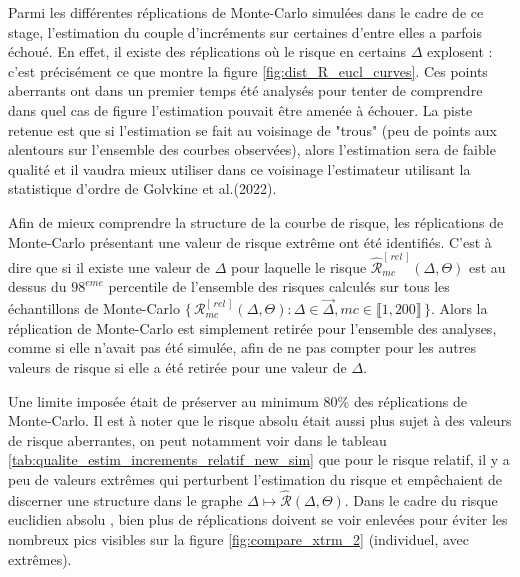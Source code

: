 
Parmi les différentes réplications de Monte-Carlo simulées dans le cadre de ce stage, l'estimation du couple d'incréments sur certaines d'entre elles a parfois échoué. En effet, il existe des réplications où le risque en certains $\Delta$ explosent : c'est précisément ce que montre la figure \ref{fig:dist_R_eucl_curves}. Ces points aberrants ont dans un premier temps été analysés pour tenter de comprendre dans quel cas de figure l'estimation pouvait être amenée à échouer. La piste retenue est que si l'estimation se fait au voisinage de "trous" (peu de points aux alentours sur l'ensemble des courbes observées), alors l'estimation sera de faible qualité et il vaudra mieux utiliser dans ce voisinage l'estimateur utilisant la statistique d'ordre de Golvkine et al.(2022).

\smallskip

Afin de mieux comprendre la structure de la courbe de risque, les réplications de Monte-Carlo présentant une valeur de risque extrême ont été identifiés. C'est à dire que si il existe une valeur de $\Delta$ pour laquelle le risque $\widehat{\mathcal R}^{[\,rel\,]}_{mc}(\Delta, \Theta)$ est au dessus du $98^{eme}$ percentile de l'ensemble des risques calculés sur tous les échantillons de Monte-Carlo $\bigl\{ \,\mathcal R^{[\,rel\,]}_{mc}(\Delta, \Theta) : \Delta \in \overrightarrow{\Delta}, mc \in \llbracket 1, 200 \rrbracket \, \bigr\}$. Alors la réplication de Monte-Carlo est simplement retirée pour l'ensemble des analyses, comme si elle n'avait pas été simulée, afin de ne pas compter pour les autres valeurs de risque si elle a été retirée pour une valeur de $\Delta$.

\smallskip

Une limite imposée était de préserver au minimum 80\% des réplications de Monte-Carlo. Il est à noter que le risque absolu était aussi plus sujet à des valeurs de risque aberrantes, on peut notamment voir dans le tableau \ref{tab:qualite_estim_increments_relatif_new_sim} que pour le risque relatif, il y a peu de valeurs extrêmes qui perturbent l'estimation du risque et empêchaient de discerner une structure dans le graphe $\Delta \mapsto \widehat{\mathcal R}( \Delta, \Theta )$. Dans le cadre du risque euclidien \og absolu \fg, bien plus de réplications doivent se voir enlevées pour éviter les nombreux pics visibles sur la figure \ref{fig:compare_xtrm_2} (individuel, avec extrêmes).
